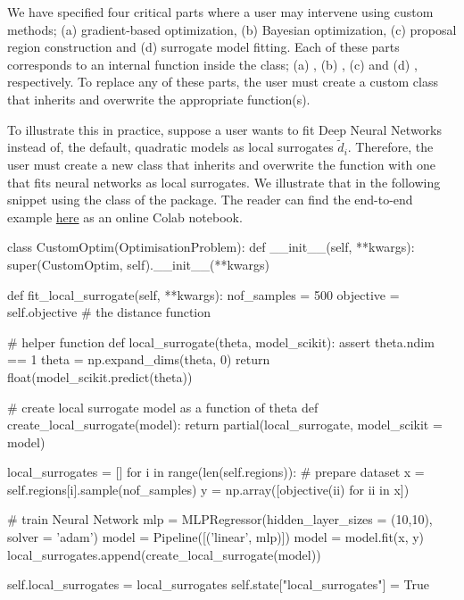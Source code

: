 \documentclass[nojss]{jss}
\begin{document}
We have specified four critical parts where a user may intervene using
custom methods; (a) gradient-based optimization, (b) Bayesian
optimization, (c) proposal region construction and (d) surrogate model
fitting. Each of these parts corresponds to an internal function
inside the  class; (a)
, (b) , (c)
 and (d) ,
respectively. To replace any of these parts, the user must create a
custom class that inherits  and overwrite the
appropriate function(s).

To illustrate this in practice, suppose a user wants to fit Deep
Neural Networks instead of, the default, quadratic models as local
surrogates \(\tilde{d}_i\). Therefore, the user must create a new
class that inherits  and overwrite the
 function with one that fits
neural networks as local surrogates. We illustrate that in the
following snippet using the  class
of the  package. The reader can find the end-to-end
example
\href{https://colab.research.google.com/drive/1_jHVxPSH3XcNOORZJpLU0SPzs0PF8CQ5?usp=sharing}{here}
as an online Colab notebook.


\begin{Code}
class CustomOptim(OptimisationProblem):
    def __init__(self, **kwargs):
        super(CustomOptim, self).__init__(**kwargs)

    def fit_local_surrogate(self, **kwargs):
        nof_samples = 500
        objective = self.objective # the distance function

        # helper function
        def local_surrogate(theta, model_scikit):
            assert theta.ndim == 1
            theta = np.expand_dims(theta, 0)
            return float(model_scikit.predict(theta))

        # create local surrogate model as a function of theta
        def create_local_surrogate(model):
            return partial(local_surrogate, model_scikit = model)

        local_surrogates = []
        for i in range(len(self.regions)):
            # prepare dataset
            x = self.regions[i].sample(nof_samples)
            y = np.array([objective(ii) for ii in x])

            # train Neural Network
            mlp = MLPRegressor(hidden_layer_sizes = (10,10), solver = 'adam')
            model = Pipeline([('linear', mlp)])
            model = model.fit(x, y)
            local_surrogates.append(create_local_surrogate(model))

        self.local_surrogates = local_surrogates
        self.state["local_surrogates"] = True
\end{Code}
\end{document}
